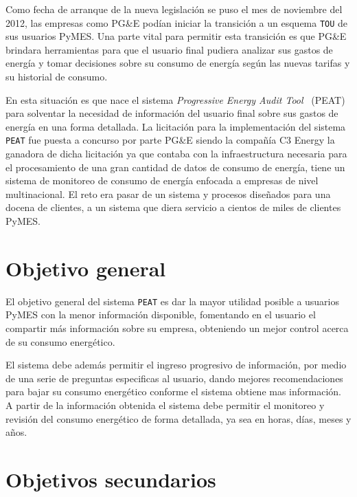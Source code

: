 Como fecha de arranque de la nueva legislación se puso el mes de noviembre del 2012,
las empresas como PG\&E podían iniciar la transición a un esquema \texttt{TOU}
de sus usuarios PyMES. Una parte vital para permitir esta transición es que
PG\&E brindara herramientas para que el usuario final pudiera analizar sus
gastos de energía y tomar decisiones sobre su consumo de energía según las
nuevas tarifas y su historial de consumo.

En esta situación es que nace el sistema \textit{Progressive
  Energy Audit Tool} \ (PEAT) para solventar la necesidad de información
del usuario final sobre sus gastos de energía en una forma detallada.
La licitación para la implementación del sistema \texttt{PEAT} fue puesta
a concurso por parte PG\&E siendo la compañía C3 Energy la ganadora de dicha
licitación  ya que contaba con la infraestructura necesaria para el
procesamiento de una gran cantidad de datos de consumo de energía,
tiene un sistema de monitoreo de consumo de energía enfocada a empresas de nivel
multinacional. El reto era pasar de un sistema y procesos diseñados
para una docena de clientes, a un sistema que diera servicio a
cientos de miles de clientes PyMES.

\section{Objetivo general}

El objetivo general del sistema \texttt{PEAT} es dar la mayor utilidad posible
a usuarios PyMES con la menor información disponible, fomentando en el usuario
el compartir más información sobre su empresa, obteniendo un mejor control
acerca de su consumo energético.

El sistema debe además permitir el ingreso progresivo de información, por medio
de una serie de preguntas especificas al usuario, dando mejores recomendaciones
para bajar su consumo energético conforme el sistema obtiene mas información.
A partir de la información obtenida el sistema debe permitir el monitoreo
y revisión del consumo energético de forma detallada, ya sea en horas,
días, meses y años.

\section{Objetivos secundarios}

